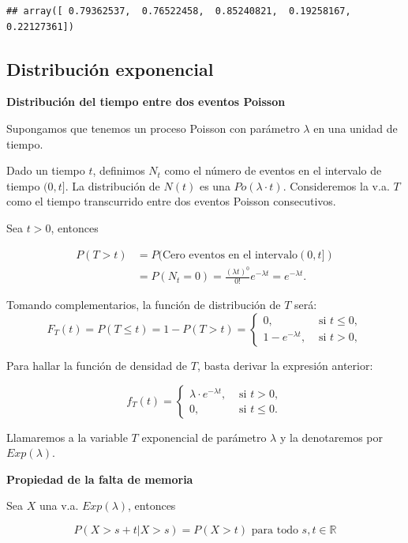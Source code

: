 \documentclass[]{book}
\begin{document}
\begin{verbatim}
## array([ 0.79362537,  0.76522458,  0.85240821,  0.19258167,  0.22127361])
\end{verbatim}

\hypertarget{distribuciuxf3n-exponencial}{%
\subsection{Distribución exponencial}\label{distribuciuxf3n-exponencial}}

\textbf{Distribución del tiempo entre dos eventos Poisson}

Supongamos que tenemos un proceso Poisson con parámetro \(\lambda\) en una unidad de tiempo.

Dado un tiempo \(t\), definimos \(N_{t}\) como el número de eventos en el intervalo de tiempo \((0,t]\). La distribución de \(N(t)\) es una \(Po(\lambda\cdot t)\). Consideremos la v.a. \(T\) como el tiempo transcurrido entre dos eventos Poisson consecutivos.

Sea \(t>0\), entonces

\[
\begin{array}{rl}
P(T>t)&=P(\mbox{Cero eventos en el intervalo}(0,t])\\
&=P(N_{t}=0)=
         \frac{(\lambda t)^0}{0!} e^{-\lambda
         t}=e^{-\lambda t}.
\end{array}
\]

Tomando complementarios, la función de distribución de \(T\) será:
\[
F_{T}(t)= P(T\leq t)=1-P(T>t)=\left\{\begin{array}{ll} 0, &\mbox{ si } t\leq 0,\\
  1-e^{-\lambda t},& \mbox{ si } t>0,\end{array}\right.
\]

Para hallar la función de densidad de \(T\), basta derivar la expresión anterior:

\[
f_{T}(t)=\left\{\begin{array}{ll}\lambda \cdot e^{-\lambda t}, & \mbox{ si }  t>0,\\
0, & \mbox{ si } t\leq 0. \end{array}\right.
\]

Llamaremos a la variable \(T\) exponencial de parámetro \(\lambda\) y la denotaremos por \(Exp(\lambda)\).

\textbf{Propiedad de la falta de memoria}

Sea \(X\) una v.a. \(Exp(\lambda)\), entonces

\[P(X>s+t\big|X>s)=P(X>t)\mbox{  para todo } s,t\in \mathbb{R}\]
\end{document}
